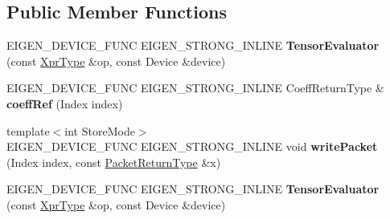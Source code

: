 \subsection*{Public Member Functions}
\begin{DoxyCompactItemize}
\item 
\mbox{\label{struct_eigen_1_1_tensor_evaluator_3_01_tensor_chipping_op_3_01_dim_id_00_01_arg_type_01_4_00_01_device_01_4_a9f2c2ad03652ad191565ef35aee68d81}} 
E\+I\+G\+E\+N\+\_\+\+D\+E\+V\+I\+C\+E\+\_\+\+F\+U\+NC E\+I\+G\+E\+N\+\_\+\+S\+T\+R\+O\+N\+G\+\_\+\+I\+N\+L\+I\+NE {\bfseries Tensor\+Evaluator} (const \hyperlink{class_eigen_1_1_tensor_chipping_op}{Xpr\+Type} \&op, const Device \&device)
\item 
\mbox{\label{struct_eigen_1_1_tensor_evaluator_3_01_tensor_chipping_op_3_01_dim_id_00_01_arg_type_01_4_00_01_device_01_4_a9d096006cff98bea766a8cd0f2b6aa25}} 
E\+I\+G\+E\+N\+\_\+\+D\+E\+V\+I\+C\+E\+\_\+\+F\+U\+NC E\+I\+G\+E\+N\+\_\+\+S\+T\+R\+O\+N\+G\+\_\+\+I\+N\+L\+I\+NE Coeff\+Return\+Type \& {\bfseries coeff\+Ref} (Index index)
\item 
\mbox{\label{struct_eigen_1_1_tensor_evaluator_3_01_tensor_chipping_op_3_01_dim_id_00_01_arg_type_01_4_00_01_device_01_4_acc780b85470b85dd5955ed3afa0f680f}} 
{\footnotesize template$<$int Store\+Mode$>$ }\\E\+I\+G\+E\+N\+\_\+\+D\+E\+V\+I\+C\+E\+\_\+\+F\+U\+NC E\+I\+G\+E\+N\+\_\+\+S\+T\+R\+O\+N\+G\+\_\+\+I\+N\+L\+I\+NE void {\bfseries write\+Packet} (Index index, const \hyperlink{group___sparse_core___module}{Packet\+Return\+Type} \&x)
\item 
\mbox{\label{struct_eigen_1_1_tensor_evaluator_3_01_tensor_chipping_op_3_01_dim_id_00_01_arg_type_01_4_00_01_device_01_4_a9f2c2ad03652ad191565ef35aee68d81}} 
E\+I\+G\+E\+N\+\_\+\+D\+E\+V\+I\+C\+E\+\_\+\+F\+U\+NC E\+I\+G\+E\+N\+\_\+\+S\+T\+R\+O\+N\+G\+\_\+\+I\+N\+L\+I\+NE {\bfseries Tensor\+Evaluator} (const \hyperlink{class_eigen_1_1_tensor_chipping_op}{Xpr\+Type} \&op, const Device \&device)

\end{DoxyCompactItemize}
